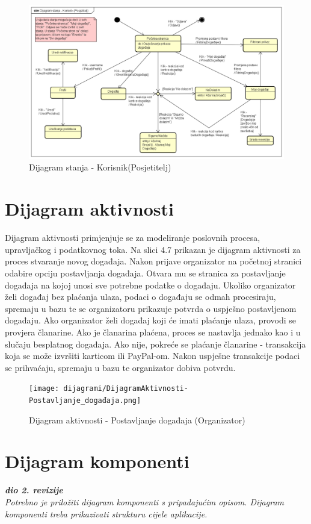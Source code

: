 			\begin{figure}[H]
			\includegraphics[scale=0.5]{dijagrami/DijagramStanja-Korisnik.png}
			\centering
			\caption{Dijagram stanja - Korisnik(Posjetitelj)}
			\label{fig:promjene}
			\end{figure}
			
			\eject 
		
		\section{Dijagram aktivnosti}
			
			Dijagram aktivnosti primjenjuje se za modeliranje poslovnih procesa, upravljačkog i podatkovnog toka. Na slici 4.7 prikazan je dijagram aktivnosti za proces stvaranje novog događaja. Nakon prijave organizator na početnoj stranici odabire opciju postavljanja događaja. Otvara mu se stranica za postavljanje događaja na kojoj unosi sve potrebne podatke o događaju. Ukoliko organizator želi događaj bez plaćanja ulaza, podaci o događaju se odmah procesiraju, spremaju u bazu te se organizatoru prikazuje potvrda o uspješno postavljenom događaju. Ako organizator želi događaj koji će imati plaćanje ulaza, provodi se provjera članarine. Ako je članarina plaćena, proces se nastavlja jednako kao i u slučaju besplatnog događaja. Ako nije, pokreće se plaćanje članarine - transakcija koja se može izvršiti karticom ili PayPal-om. Nakon uspješne transakcije podaci se prihvaćaju, spremaju u bazu te organizator dobiva potvrdu.
			
			\begin{figure}[H]
				\texttt{[image: dijagrami/DijagramAktivnosti-Postavljanje\_događaja.png]}
				\centering
				\caption{Dijagram aktivnosti - Postavljanje događaja (Organizator)}
				\label{fig:promjene}
			\end{figure}
			
			\eject
		\section{Dijagram komponenti}
		
			\textbf{\textit{dio 2. revizije}}\\
		
			 \textit{Potrebno je priložiti dijagram komponenti s pripadajućim opisom. Dijagram komponenti treba prikazivati strukturu cijele aplikacije.}